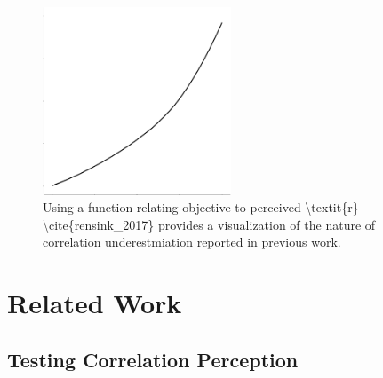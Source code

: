 \documentclass[manuscript, review, anonymous, screen]{acmart}
\begin{document}
\begin{figure}

\includegraphics[width=0.5\textwidth,height=\textheight]{size_and_contrast_new_files/figure-pdf/fig-underestimation-curve-1.pdf} \hfill{}

\caption{\label{fig-underestimation-curve}Using a function relating
objective to perceived \textbackslash textit\{r\}
\textbackslash cite\{rensink\_2017\} provides a visualization of the
nature of correlation underestmiation reported in previous work.}

\end{figure}

\hypertarget{sec-related-work}{%
\section{Related Work}\label{sec-related-work}}

\hypertarget{sec-testing-corr-percept}{%
\subsection{Testing Correlation
Perception}\label{sec-testing-corr-percept}}
\end{document}
